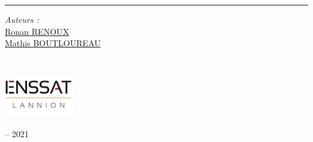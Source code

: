 \begin{titlepage}
  \doublespacing
  \large
  \hfill
  \vspace{1cm}
  \begin{center}
    \doublespacing
    \textcolor{Maroon}{\huge{\myTitle}}
  \end{center}
  \vspace{1.25cm}
  \hrule
  \vspace{1.5cm}
  \onehalfspacing
  \begin{center}

    \begin{minipage}[t]{0.5\textwidth}
      \begin{flushleft}
        \emph{Auteurs :} \\
        \href{https://ronanren.github.io/}{Ronan \textsc{RENOUX}} \\
        \href{https://mboultoureau.com}{Mathis \textsc{BOUTLOUREAU}} \\
      \end{flushleft}
    \end{minipage}
    \begin{minipage}[t]{0.4\textwidth}
      \begin{flushright}
        
      \end{flushright}
    \end{minipage}\\[1.5cm]

    \hfill
    \vfill

    \includegraphics[width=3cm]{figures/ENSSAT_Logo}\\
    \href{https://www.enssat.fr/}{\mySchool}\\
    {\myDepartment} -- 2021\\
    \href{https://www.univ-rennes1.fr/}{\myUni}
  \end{center}
\end{titlepage}
